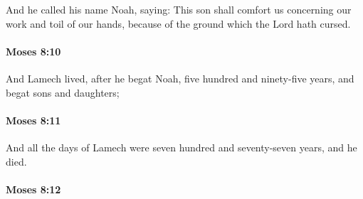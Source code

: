 			And he called his name Noah, saying: This son shall comfort us concerning our work and toil of our hands, because of the ground which the Lord hath cursed.


		\paragraph{Moses 8:10} %
			\label{MOSES-8-10}

			And Lamech lived, after he begat Noah, five hundred and ninety-five years, and begat sons and daughters;


		\paragraph{Moses 8:11} %
			\label{MOSES-8-11}

			And all the days of Lamech were seven hundred and seventy-seven years, and he died.


		\paragraph{Moses 8:12} %
			\label{MOSES-8-12}


